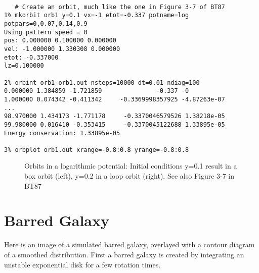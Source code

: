 \footnotesize\begin{verbatim}

   # Create an orbit, much like the one in Figure 3-7 of BT87
1% mkorbit orb1 y=0.1 vx=-1 etot=-0.337 potname=log potpars=0,0.07,0.14,0.9
Using pattern speed = 0
pos: 0.000000 0.100000 0.000000
vel: -1.000000 1.330308 0.000000
etot: -0.337000
lz=0.100000

2% orbint orb1 orb1.out nsteps=10000 dt=0.01 ndiag=100
0.000000 1.384859 -1.721859               -0.337 -0
1.000000 0.074342 -0.411342     -0.3369998357925 -4.87263e-07
...
98.970000 1.434173 -1.771178     -0.3370046579526 1.38218e-05
99.980000 0.016410 -0.353415     -0.3370045122688 1.33895e-05
Energy conservation: 1.33895e-05

3% orbplot orb1.out xrange=-0.8:0.8 yrange=-0.8:0.8

\end{verbatim}\normalsize

\begin{figure}[t]
\caption{Orbits in a logarithmic potential:
Initial conditions y=0.1 result in a box orbit (left), 
y=0.2 in a loop orbit (right). See also Figure 3-7 in BT87}
\label{f:log}
\end{figure}

\section{Barred Galaxy}

Here is an image of a simulated barred galaxy, overlayed with a contour diagram
of a smoothed distribution. First a barred galaxy is created by
integrating an unstable exponential disk for a few rotation times.

